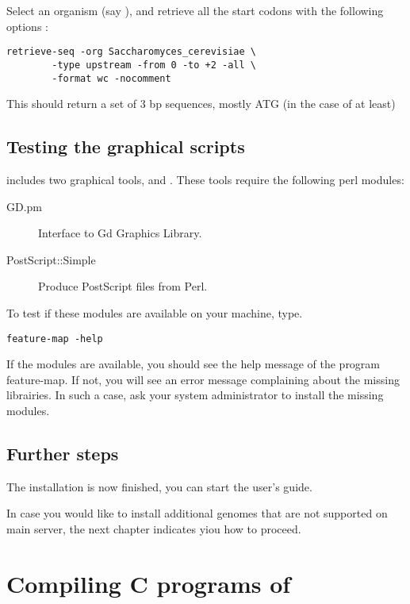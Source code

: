 \documentclass{book}
\begin{document}
Select an organism (say ), and
retrieve all the start codons with the following options :

\begin{verbatim}
retrieve-seq -org Saccharomyces_cerevisiae \
        -type upstream -from 0 -to +2 -all \
        -format wc -nocomment
\end{verbatim}

This should return a set of 3 bp sequences, mostly ATG (in the case of
 at least)

\section{Testing the graphical scripts}

\RSAT includes two graphical tools,  and
. These tools require the following  perl modules:

\begin{description}
\item[GD.pm] Interface to Gd Graphics Library.
\item[PostScript::Simple]  Produce PostScript files from Perl.
\end{description}

To test if these modules are available on your machine, type.

\begin{verbatim}
feature-map -help
\end{verbatim}

If the modules are available, you should see the help message of the
program feature-map. If not, you will see an error message complaining
about the missing librairies. In such a case, ask your system
administrator to install the missing modules.

\section{Further steps}

The installation is now finished, you can start the user's guide.

In case you would like to install additional genomes that are not
supported on \RSAT main server, the next chapter indicates yiou how to
proceed.

\chapter{Compiling C programs of \RSAT}
\end{document}
